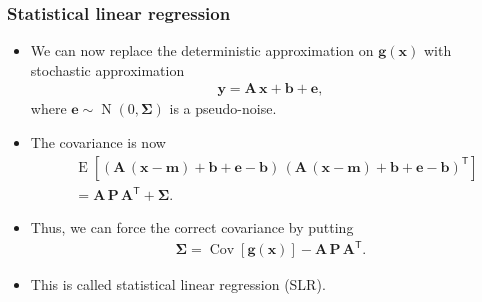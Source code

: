 \documentclass[first=dgreen,second=purple,presentation]{elecslides}
\newcommand{\mbf}[1]{\mathbf{#1}}
\newcommand{\mathbold}[1]{\bm{#1}}
\newcommand{\T}[0]{\mathsf{T}}
\DeclareMathOperator{\Cov}{Cov}
\DeclareMathOperator{\E}{E}
\DeclareMathOperator{\N}{N}
\newcommand{\MSigma}[0]{\mathbold{\Sigma}}
\newcommand{\vb}{\mbf{b}}
\newcommand{\ve}{\mbf{e}}
\newcommand{\vg}{\mbf{g}}
\newcommand{\vm}{\mbf{m}}
\newcommand{\vx}{\mbf{x}}
\newcommand{\vy}{\mbf{y}}
\newcommand{\MA}{\mbf{A}}
\newcommand{\MP}{\mbf{P}}
\begin{document}
\begin{frame}
 \frametitle{Statistical linear regression}

\begin{itemize}[<+->]
\item We can now replace the deterministic approximation on $\vg(\vx)$ with \alert{stochastic approximation}
%
\begin{equation}
\begin{split}
  \vy = \MA \, \vx + \vb + \ve,
\end{split}
\nonumber
\end{equation}
%
where $\ve \sim \N(0,\MSigma)$ is a \alert{pseudo-noise}.

\item The \alert{covariance} is now
%
\begin{equation}
\begin{split}
  &\E\left[ (\MA \, (\vx - \vm) + \vb + \ve - \vb) \, (\MA \, (\vx - \vm) + \vb + \ve - \vb)^\T \right] \\
  &= \MA \, \MP \, \MA^\T + \MSigma.
\end{split}
\nonumber
\end{equation}

\item Thus, we can \alert{force the correct covariance} by putting
%
\begin{equation}
\begin{split}
  \MSigma = \Cov\left[ \vg(\vx) \right] - \MA \, \MP \, \MA^\T.
\end{split}
\nonumber
\end{equation}

\item This is called \alert{statistical linear regression (SLR)}.
\end{itemize}
\end{frame}
\end{document}
